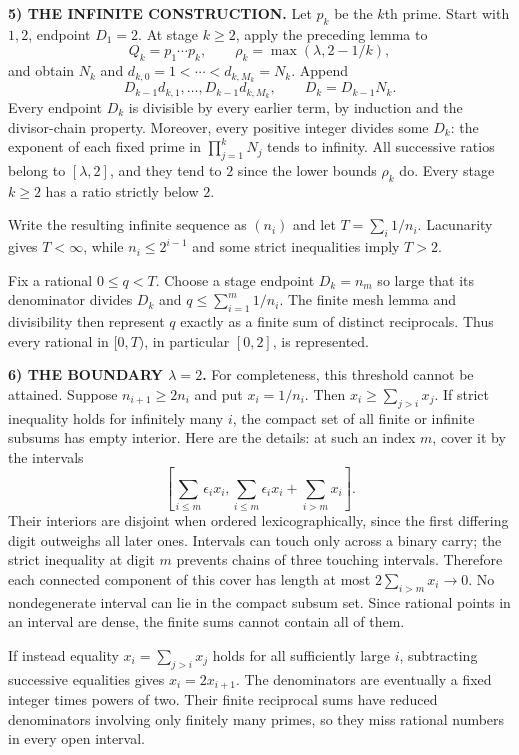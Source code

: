 \noindent\textbf{5) THE INFINITE CONSTRUCTION.}
Let $p_k$ be the $k$th prime. Start with $1,2$, endpoint $D_1=2$. At stage $k\ge2$, apply the preceding lemma to
\[
 Q_k=p_1\cdots p_k,
 \qquad \rho_k=\max(\lambda,2-1/k),
\]
and obtain $N_k$ and $d_{k,0}=1<\cdots<d_{k,M_k}=N_k$. Append
\[
 D_{k-1}d_{k,1},\ldots,D_{k-1}d_{k,M_k},
 \qquad D_k=D_{k-1}N_k.
\]
Every endpoint $D_k$ is divisible by every earlier term, by induction and the divisor-chain property. Moreover, every positive integer divides some $D_k$: the exponent of each fixed prime in $\prod_{j=1}^kN_j$ tends to infinity. All successive ratios belong to $[\lambda,2]$, and they tend to $2$ since the lower bounds $\rho_k$ do. Every stage $k\ge2$ has a ratio strictly below $2$.

Write the resulting infinite sequence as $(n_i)$ and let $T=\sum_i1/n_i$. Lacunarity gives $T<\infty$, while $n_i\le2^{i-1}$ and some strict inequalities imply $T>2$.

Fix a rational $0\le q<T$. Choose a stage endpoint $D_k=n_m$ so large that its denominator divides $D_k$ and $q\le\sum_{i=1}^m1/n_i$. The finite mesh lemma and divisibility then represent $q$ exactly as a finite sum of distinct reciprocals. Thus every rational in $[0,T)$, in particular $[0,2]$, is represented.

\noindent\textbf{6) THE BOUNDARY $\lambda=2$.}
For completeness, this threshold cannot be attained. Suppose $n_{i+1}\ge2n_i$ and put $x_i=1/n_i$. Then $x_i\ge\sum_{j>i}x_j$. If strict inequality holds for infinitely many $i$, the compact set of all finite or infinite subsums has empty interior. Here are the details: at such an index $m$, cover it by the intervals
\[
 \left[\sum_{i\le m}\epsilon_ix_i,
       \sum_{i\le m}\epsilon_ix_i+\sum_{i>m}x_i\right].
\]
Their interiors are disjoint when ordered lexicographically, since the first differing digit outweighs all later ones. Intervals can touch only across a binary carry; the strict inequality at digit $m$ prevents chains of three touching intervals. Therefore each connected component of this cover has length at most $2\sum_{i>m}x_i\to0$. No nondegenerate interval can lie in the compact subsum set. Since rational points in an interval are dense, the finite sums cannot contain all of them.

If instead equality $x_i=\sum_{j>i}x_j$ holds for all sufficiently large $i$, subtracting successive equalities gives $x_i=2x_{i+1}$. The denominators are eventually a fixed integer times powers of two. Their finite reciprocal sums have reduced denominators involving only finitely many primes, so they miss rational numbers in every open interval.

